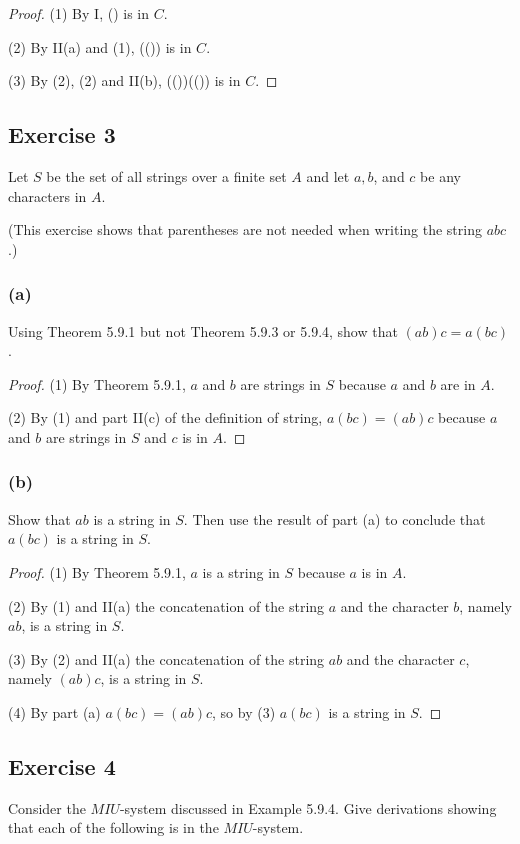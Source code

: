 \documentclass[14pt]{extarticle}
\begin{document}
\begin{proof}
(1) By I, () is in $C$.

(2) By II(a) and (1), (()) is in $C$.

(3) By (2), (2) and II(b), (())(()) is in $C$.
\end{proof}

\subsection{Exercise 3}
Let $S$ be the set of all strings over a finite set $A$ and let $a, b$, and $c$ be any characters in $A$.

(This exercise shows that parentheses are not needed when writing the string $abc$.)

\subsubsection{(a)}
Using Theorem 5.9.1 but not Theorem 5.9.3 or 5.9.4, show that \((ab)c = a(bc)\).

\begin{proof}
(1) By Theorem 5.9.1, $a$ and $b$ are strings in $S$ because $a$ and $b$ are in $A$.

(2) By (1) and part II(c) of the definition of string, $a(bc) = (ab)c$ because $a$ and $b$ are strings in $S$ and 
$c$ is in $A$.
\end{proof}

\subsubsection{(b)}
Show that $ab$ is a string in $S$. Then use the result of part (a) to conclude that $a(bc)$ is a string in $S$.

\begin{proof}
(1) By Theorem 5.9.1, $a$ is a string in $S$ because $a$ is in $A$.

(2) By (1) and II(a) the concatenation of the string $a$ and the character $b$, namely $ab$, is a string in $S$.

(3) By (2) and II(a) the concatenation of the string $ab$ and the character $c$, namely $(ab)c$, is a string in $S$.

(4) By part (a) $a(bc) = (ab)c$, so by (3) $a(bc)$ is a string in $S$.
\end{proof}

\subsection{Exercise 4}
Consider the $M I U$-system discussed in Example 5.9.4. Give derivations showing that each of the following is in the $M I U$-system.
\end{document}
